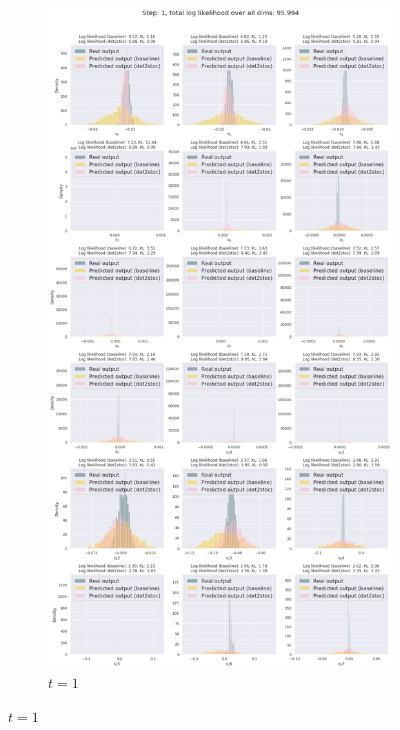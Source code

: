 \begin{figure}
\centering
\begin{subfigure}{\textwidth}
    \includegraphics[trim=0 1650 0 50,clip,width=1.0\textwidth]
    {img/windyslope/output/output_distribution_step1_delta_all}
    \caption{$t=1$}
    \label{fig:output_distribution_step1_posvel_dettostoc}

\end{subfigure}
\end{figure}
